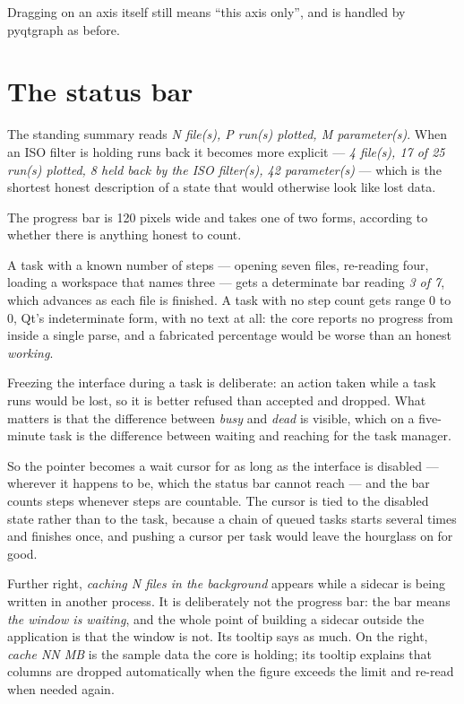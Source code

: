 \documentclass[11pt,a4paper,oneside]{report}
\begin{document}
Dragging on an axis itself still means ``this axis only'', and is handled by
pyqtgraph as before.

\section{The status bar}
\label{sec:statusbar}

The standing summary reads \emph{N file(s), P run(s) plotted, M parameter(s)}.
When an ISO filter is holding runs back it becomes more explicit ---
\emph{4 file(s), 17 of 25 run(s) plotted, 8 held back by the ISO filter(s), 42
parameter(s)} --- which is the shortest honest description of a state that would
otherwise look like lost data.

The progress bar is 120 pixels wide and takes one of two forms, according to
whether there is anything honest to count.

A task with a known number of steps --- opening seven files, re-reading four,
loading a workspace that names three --- gets a determinate bar reading
\emph{3 of 7}, which advances as each file is finished. A task with no step
count gets range 0 to 0, Qt's indeterminate form, with no text at all: the core
reports no progress from inside a single parse, and a fabricated percentage
would be worse than an honest \emph{working}.

Freezing the interface during a task is deliberate: an action taken while a
task runs would be lost, so it is better refused than accepted and dropped.
What matters is that the difference between \emph{busy} and \emph{dead} is
visible, which on a five-minute task is the difference between waiting and
reaching for the task manager.

So the pointer becomes a wait cursor for as long as the interface is disabled
--- wherever it happens to be, which the status bar cannot reach --- and the bar
counts steps whenever steps are countable. The cursor is tied to the disabled
state rather than to the task, because a chain of queued tasks starts several
times and finishes once, and pushing a cursor per task would leave the hourglass
on for good.

Further right, \emph{caching N files in the background} appears while a sidecar
is being written in another process. It is deliberately not the progress bar:
the bar means \emph{the window is waiting}, and the whole point of building a
sidecar outside the application is that the window is not. Its tooltip says as
much. On the right, \emph{cache NN MB} is the sample data the core is holding;
its tooltip explains that columns are dropped automatically when the figure
exceeds the limit and re-read when needed again.
\end{document}
